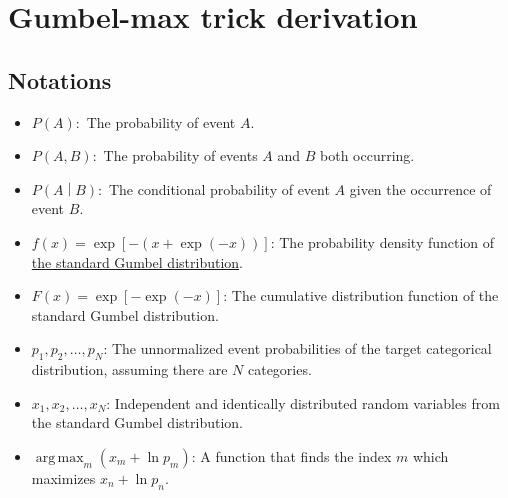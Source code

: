 \documentclass{book}[12pt]
\DeclareMathOperator*{\argmax}{arg\,max}
\begin{document}
\chapter*{Gumbel-max trick derivation}

\section*{Notations}
\begin{itemize}
    \item $P\left(A\right):$ The probability of event $A$.
    \item $P\left(A,B\right):$ The probability of events $A$ and $B$ both occurring.
    \item $P\left(A\middle|B\right):$ The conditional probability of event $A$ given the occurrence of event $B$.
    \item $f(x)=\exp\left[-\left(x+\exp\left(-x\right)\right)\right]$: The probability density function of \href{https://en.wikipedia.org/wiki/Gumbel_distribution#Standard_Gumbel_distribution}{the standard Gumbel distribution}.
    \item $F(x)=\exp\left[-\exp\left(-x\right)\right]$: The cumulative distribution function of the standard Gumbel distribution.
    \item $p_1,p_2,\dots,p_N$: The unnormalized event probabilities of the target categorical distribution, assuming there are $N$ categories.
    \item $x_1,x_2,\dots,x_N$: Independent and identically distributed random variables from the standard Gumbel distribution.
    \item $\argmax_m\left(x_m+\ln p_m\right)$: A function that finds the index $m$ which maximizes $x_n+\ln p_n$.
\end{itemize}
\end{document}
